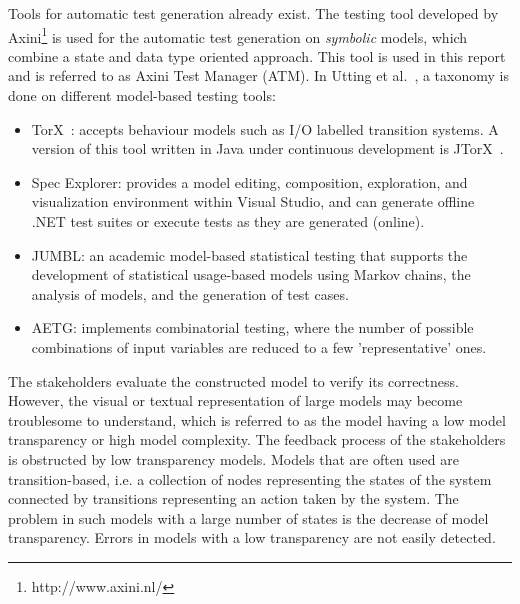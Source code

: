 Tools for automatic test generation already exist. The testing tool developed by Axini\footnote{http://www.axini.nl/} is used for the automatic test generation on \textit{symbolic} models, which combine a state and data type oriented approach. This tool is used in this report and is referred to as Axini Test Manager (ATM). In Utting et al.~\cite{Utting:MBTTaxonomy}, a taxonomy is done on different model-based testing tools:
\begin{itemize}
  \item TorX~\cite{Tretmans:TorX}: accepts behaviour models such as I/O labelled transition systems. A version of this tool written in Java under continuous development is JTorX~\cite{Belinfante:JTorX}.
  \item Spec Explorer\cite{Veanes:SpecExplorer}: provides a model editing, composition, exploration,
and visualization environment within Visual Studio, and can generate offline .NET test suites or
execute tests as they are generated (online).
  \item JUMBL\cite{Prowell:JUMBL}: an academic model-based statistical testing that supports the development of statistical usage-based models using Markov chains, the analysis of models, and the generation of test cases.
  \item AETG\cite{Cohen:AETG}: implements combinatorial testing, where the number of possible combinations of input variables are reduced to a few 'representative' ones.
\end{itemize}

The stakeholders evaluate the constructed model to verify its correctness. However, the visual or textual representation of large models may become troublesome to understand, which is referred to as the model having a low model transparency or high model complexity. The feedback process of the stakeholders is obstructed by low transparency models. Models that are often used are transition-based, i.e. a collection of nodes representing the states of the system connected by transitions representing an action taken by the system. The problem in such models with a large number of states is the decrease of model transparency. Errors in models with a low transparency are not easily detected.

